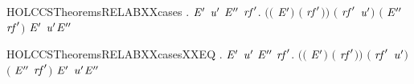 \begin{SaveVerbatim}{HOLCCSTheoremsRELABXXcases}
\HOLTokenTurnstile{} \HOLSymConst{\HOLTokenForall{}}   .
          \HOLTokenTransBegin{}\HOLTokenTransEnd {} \HOLSymConst{\HOLTokenImp{}}
       \HOLSymConst{\HOLTokenExists{}}\ensuremath{\HOLBoundVar{E}\sp{\prime}} \ensuremath{\HOLBoundVar{u}\sp{\prime}} \ensuremath{\HOLBoundVar{E}\sp{\prime\prime}} \ensuremath{\HOLBoundVar{rf}\sp{\prime}}.
           \ensuremath{(}\ensuremath{(} \HOLSymConst{\ensuremath{=}} \ensuremath{\HOLBoundVar{E}\sp{\prime}}\ensuremath{)} \HOLSymConst{\HOLTokenConj{}} \ensuremath{(} \HOLSymConst{\ensuremath{=}} \ensuremath{\HOLBoundVar{rf}\sp{\prime}}\ensuremath{)}\ensuremath{)} \HOLSymConst{\HOLTokenConj{}} \ensuremath{(} \HOLSymConst{\ensuremath{=}}  \ensuremath{\HOLBoundVar{rf}\sp{\prime}} \ensuremath{\HOLBoundVar{u}\sp{\prime}}\ensuremath{)} \HOLSymConst{\HOLTokenConj{}}
           \ensuremath{(} \HOLSymConst{\ensuremath{=}}  \ensuremath{\HOLBoundVar{E}\sp{\prime\prime}} \ensuremath{\HOLBoundVar{rf}\sp{\prime}}\ensuremath{)} \HOLSymConst{\HOLTokenConj{}} \ensuremath{\HOLBoundVar{E}\sp{\prime}} \HOLTokenTransBegin\ensuremath{\HOLBoundVar{u}\sp{\prime}}\HOLTokenTransEnd \ensuremath{\HOLBoundVar{E}\sp{\prime\prime}}
\end{SaveVerbatim}
\newcommand{\HOLCCSTheoremsRELABXXcases}{\UseVerbatim{HOLCCSTheoremsRELABXXcases}}
\begin{SaveVerbatim}{HOLCCSTheoremsRELABXXcasesXXEQ}
\HOLTokenTurnstile{} \HOLSymConst{\HOLTokenForall{}}   .
          \HOLTokenTransBegin{}\HOLTokenTransEnd {} \HOLSymConst{\HOLTokenEquiv{}}
       \HOLSymConst{\HOLTokenExists{}}\ensuremath{\HOLBoundVar{E}\sp{\prime}} \ensuremath{\HOLBoundVar{u}\sp{\prime}} \ensuremath{\HOLBoundVar{E}\sp{\prime\prime}} \ensuremath{\HOLBoundVar{rf}\sp{\prime}}.
           \ensuremath{(}\ensuremath{(} \HOLSymConst{\ensuremath{=}} \ensuremath{\HOLBoundVar{E}\sp{\prime}}\ensuremath{)} \HOLSymConst{\HOLTokenConj{}} \ensuremath{(} \HOLSymConst{\ensuremath{=}} \ensuremath{\HOLBoundVar{rf}\sp{\prime}}\ensuremath{)}\ensuremath{)} \HOLSymConst{\HOLTokenConj{}} \ensuremath{(} \HOLSymConst{\ensuremath{=}}  \ensuremath{\HOLBoundVar{rf}\sp{\prime}} \ensuremath{\HOLBoundVar{u}\sp{\prime}}\ensuremath{)} \HOLSymConst{\HOLTokenConj{}}
           \ensuremath{(} \HOLSymConst{\ensuremath{=}}  \ensuremath{\HOLBoundVar{E}\sp{\prime\prime}} \ensuremath{\HOLBoundVar{rf}\sp{\prime}}\ensuremath{)} \HOLSymConst{\HOLTokenConj{}} \ensuremath{\HOLBoundVar{E}\sp{\prime}} \HOLTokenTransBegin\ensuremath{\HOLBoundVar{u}\sp{\prime}}\HOLTokenTransEnd \ensuremath{\HOLBoundVar{E}\sp{\prime\prime}}
\end{SaveVerbatim}
